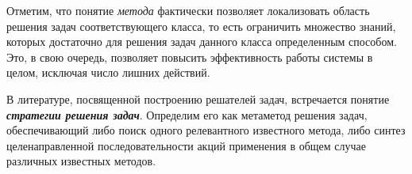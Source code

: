 Отметим, что понятие \textit{метода} фактически позволяет локализовать область решения задач соответствующего класса, то есть ограничить множество знаний, которых достаточно для решения задач данного класса определенным способом. Это, в свою очередь, позволяет повысить эффективность работы системы в целом, исключая число лишних действий.

\begin{SCn}
	\begin{scnindent}
		\begin{scnindent}
		\end{scnindent}
	\end{scnindent}
\end{SCn}

В литературе, посвященной построению решателей задач, встречается понятие \textbf{\textit{стратегии решения задач}}. Определим его как метаметод решения задач, обеспечивающий либо поиск одного релевантного известного метода, либо синтез целенаправленной последовательности акций применения в общем случае различных известных методов.

\begin{SCn}
\end{SCn}

